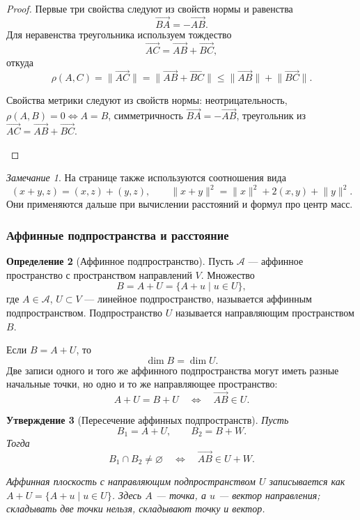 \documentclass[12pt,a4paper]{article}
\theoremstyle{definition}
\newtheorem{definition}{Определение}[section]
\theoremstyle{plain}
\newtheorem{proposition}[definition]{Утверждение}
\theoremstyle{remark}
\newtheorem{remark}[definition]{Замечание}
\newenvironment{knowledgefix}{\begin{clarifybox}}{\end{clarifybox}}
\newcommand{\A}{\mathcal{A}}
\begin{document}
\begin{proof}
Первые три свойства следуют из свойств нормы и равенства
\[
    \overrightarrow{BA}=-\overrightarrow{AB}.
\]
Для неравенства треугольника используем тождество
\[
    \overrightarrow{AC}=\overrightarrow{AB}+\overrightarrow{BC},
\]
откуда
\[
    \rho(A,C)=\lVert\overrightarrow{AC}\rVert
    =\lVert\overrightarrow{AB}+\overrightarrow{BC}\rVert
    \le \lVert\overrightarrow{AB}\rVert+\lVert\overrightarrow{BC}\rVert.
\]
\begin{knowledgefix}
Свойства метрики следуют из свойств нормы: неотрицательность, \(\rho(A,B)=0\Leftrightarrow A=B\), симметричность \(\overrightarrow{BA}=-\overrightarrow{AB}\), треугольник из \(\overrightarrow{AC}=\overrightarrow{AB}+\overrightarrow{BC}\).
\end{knowledgefix}
\end{proof}

\begin{remark}
На странице также используются соотношения вида
\[
    (x+y,z)=(x,z)+(y,z),\qquad
    \lVert x+y\rVert^2=\lVert x\rVert^2+2(x,y)+\lVert y\rVert^2.
\]
Они применяются дальше при вычислении расстояний и формул про центр масс.
\end{remark}

\subsubsection*{Аффинные подпространства и расстояние}

\begin{definition}[Аффинное подпространство]
Пусть $\A$ --- аффинное пространство с пространством направлений $V$.
Множество
\[
    B=A+U=\{A+u\mid u\in U\},
\]
где $A\in\A$, $U\subset V$ --- линейное подпространство, называется аффинным подпространством. Подпространство $U$ называется направляющим пространством $B$.
\end{definition}

Если $B=A+U$, то
\[
    \dim B=\dim U.
\]
Две записи одного и того же аффинного подпространства могут иметь разные начальные точки, но одно и то же направляющее пространство:
\[
    A+U=B+U
    \quad\Longleftrightarrow\quad
    \overrightarrow{AB}\in U.
\]

\begin{proposition}[Пересечение аффинных подпространств]
Пусть
\[
    B_1=A+U,
    \qquad
    B_2=B+W.
\]
Тогда
\[
    B_1\cap B_2\ne\varnothing
    \quad\Longleftrightarrow\quad
    \overrightarrow{AB}\in U+W.
\]
\begin{knowledgefix}
Аффинная плоскость с направляющим подпространством \(U\) записывается как \(A+U=\{A+u\mid u\in U\}\). Здесь \(A\) — точка, а \(u\) — вектор направления; складывать две точки нельзя, складывают точку и вектор.
\end{knowledgefix}
\end{proposition}
\end{document}
